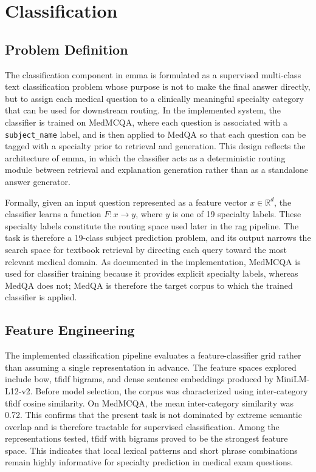 \chapter{Classification}

\section{Problem Definition}
The classification component in \gls{emma} is formulated as a supervised multi-class text classification problem whose purpose is not to make the final answer directly, but to assign each medical question to a clinically meaningful specialty category that can be used for downstream routing. In the implemented system, the classifier is trained on MedMCQA, where each question is associated with a \texttt{subject\_name} label, and is then applied to MedQA so that each question can be tagged with a specialty prior to retrieval and generation. This design reflects the architecture of \gls{emma}, in which the classifier acts as a deterministic routing module between retrieval and explanation generation rather than as a standalone answer generator. 

Formally, given an input question represented as a feature vector $x \in \mathbb{R}^d$, the classifier learns a function $F: x \rightarrow y$, where $y$ is one of 19 specialty labels. These specialty labels constitute the routing space used later in the \gls{rag} pipeline. The task is therefore a 19-class subject prediction problem, and its output narrows the search space for textbook retrieval by directing each query toward the most relevant medical domain. As documented in the implementation, MedMCQA is used for classifier training because it provides explicit specialty labels, whereas MedQA does not; MedQA is therefore the target corpus to which the trained classifier is applied. 

\section{Feature Engineering}

The implemented classification pipeline evaluates a feature-classifier grid rather than assuming a single representation in advance. The feature spaces explored include \gls{bow}, \gls{tfidf} bigrams, and dense sentence embeddings produced by MiniLM-L12-v2. Before model selection, the corpus was characterized using inter-category \gls{tfidf} cosine similarity. On MedMCQA, the mean inter-category similarity was 0.72. This confirms that the present task is not dominated by extreme semantic overlap and is therefore tractable for supervised classification. Among the representations tested, \gls{tfidf} with bigrams proved to be the strongest feature space. This indicates that local lexical patterns and short phrase combinations remain highly informative for specialty prediction in medical exam questions.

